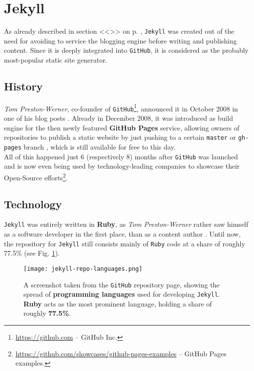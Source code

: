 \section{Jekyll}
\label{sec:jekyll}

As already described in section <<\emph{}>> on p. \pageref{par:creatingcontent}, \texttt{Jekyll} was created out of the need for avoiding to service the blogging engine before writing and publishing content. Since it is deeply integrated into \texttt{GitHub}, it is considered as the probably most-popular static site generator.

\subsection{History}
\label{sec:jekyll-history}
\emph{Tom Preston-Werner}, co-founder of \texttt{GitHub}\footnote{\url{https://github.com} -- GitHub Inc.}, announced it in October 2008 in one of his blog posts \cite{PrestonWerner2008jekyll}. Already in December 2008, it was introduced as build engine for the then newly featured \textbf{GitHub Pages} service, allowing owners of repositories to publish a static website by just pushing to a certain \texttt{master} or \texttt{gh-pages} branch \cite{PrestonWerner2008githubpages}, which is still available for free to this day.\\
All of this happened just 6 (respectively 8) months after \texttt{GitHub} was launched \cite{PrestonWerner2008githublaunch} and is now even being used by technology-leading companies to showcase their Open-Source efforts\footnote{\url{https://github.com/showcases/github-pages-examples} -- GitHub Pages examples.}.

\subsection{Technology}
\label{sec:jekyll-technology}
\texttt{Jekyll} was entirely written in \textbf{Ruby}, as \emph{Tom Preston-Werner} rather saw himself as a software developer in the first place, than as a content author \cite{PrestonWerner2008jekyll}. Until now, the repository for \texttt{Jekyll} still consists mainly of \texttt{Ruby} code at a share of roughly 77.5\% (see Fig. \ref{fig:jekyll-languages}).

\begin{figure}
    \centering
    \texttt{[image: jekyll-repo-languages.png]}
    \caption{A screenshot taken from the \texttt{GitHub} repository page, showing the spread of \textbf{programming languages} used for developing \texttt{Jekyll}. \textbf{Ruby} acts as the most prominent language, holding a share of roughly \textbf{77.5\%}.}
    \label{fig:jekyll-languages}
\end{figure}
%

